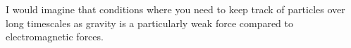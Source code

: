 I would imagine that conditions where you need to keep track of particles over long timescales as gravity is a particularly weak force compared to electromagnetic forces. 